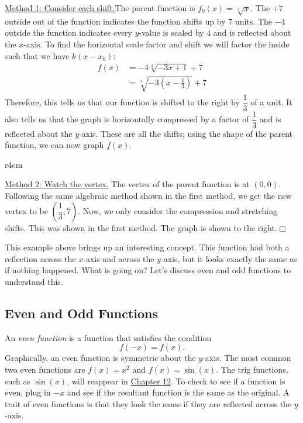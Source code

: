 \documentclass[../book.tex]{subfiles}
\begin{document}
\begin{solution}
\underline{Method 1: Consider each shift.}\newline The parent function is $f_0(x)=\sqrt[3]{x}$.  The $+7$ outside out of the function indicates the function shifts up by $7$ units.  The $-4$ outside the function indicates every $y$-value is scaled by $4$ and is reflected about the $x$-axis.  To find the horizontal scale factor and shift we will factor the inside such that we have $k(x-x_0)$: \begin{align*}
    f(x)&= -4\sqrt[3]{-3x+1}+7 \\
    &= \sqrt[3]{-3\left(x-\frac{1}{3}\right)}+7
\end{align*}
Therefore, this tells us that our function is shifted to the right by $\dfrac{1}{3}$ of a unit.  It also tells us that the graph is horizontally compressed by a factor of $\dfrac{1}{3}$ and is reflected about the $y$-axis.  These are all the shifts; using the shape of the parent function, we can now graph $f(x)$.  \newline 
\begin{wrapfigure}{r}{4cm}
    \centering
\end{wrapfigure}
\underline{Method 2: Watch the vertex.} \newline The vertex of the parent function is at $(0,0)$.  Following the same algebraic method shown in the first method, we get the new vertex to be $\left(\dfrac{1}{3},7\right)$.  Now, we only consider the compression and stretching shifts.  This was shown in the first method.  \newline
The graph is shown to the right.$\Box$
\end{solution}
This example above brings up an interesting concept.  This function had both a reflection across the $x$-axis and across the $y$-axis, but it looks exactly the same as if nothing happened.  What is going on?  Let's discuss even and odd functions to understand this.
\subsection{Even and Odd Functions}
\noindent An \textit{even function} is a function that satisfies the condition $$f(-x)=f(x).$$  Graphically, an even function is symmetric about the $y$-axis.  The most common two even functions are $f(x)=x^2$ and $f(x)=\sin(x)$.  The trig functions, such as $\sin(x)$, will reappear in \hyperlink{chapter.12}{Chapter 12}.  To check to see if a function is even, plug in $-x$ and see if the resultant function is the same as the original.  A trait of even functions is that they look the same if they are reflected across the $y$-axis.
\end{document}
